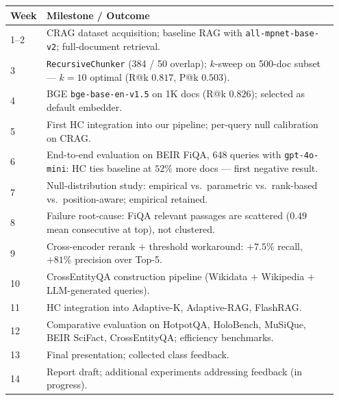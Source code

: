 \documentclass[letterpaper]{article}
\begin{document}
\begin{center}
\small
\begin{tabular}{p{0.07\linewidth}p{0.88\linewidth}}
\hline
Week & Milestone / Outcome \\
\hline
1--2  & CRAG \cite{crag2024} dataset acquisition; baseline RAG with
\texttt{all-mpnet-base-v2}; full-document retrieval. \\
3     & \texttt{RecursiveChunker} (384 / 50 overlap); $k$-sweep on
500-doc subset --- $k{=}10$ optimal (R@k $0.817$, P@k $0.503$). \\
4     & BGE \texttt{bge-base-en-v1.5} on 1K docs (R@k $0.826$);
selected as default embedder. \\
5     & First HC integration into our pipeline; per-query null
calibration on CRAG. \\
6     & End-to-end evaluation on BEIR FiQA, 648 queries with
\texttt{gpt-4o-mini}: HC ties baseline at $52\%$ more docs ---
first negative result. \\
7     & Null-distribution study: empirical vs.\ parametric vs.\
rank-based vs.\ position-aware; empirical retained. \\
8     & Failure root-cause: FiQA relevant passages are scattered
($0.49$ mean consecutive at top), not clustered. \\
9     & Cross-encoder rerank $+$ threshold workaround:
$+7.5\%$ recall, $+81\%$ precision over Top-5. \\
10    & CrossEntityQA construction pipeline (Wikidata $+$
Wikipedia $+$ LLM-generated queries). \\
11    & HC integration into Adaptive-K, Adaptive-RAG, FlashRAG. \\
12    & Comparative evaluation on HotpotQA, HoloBench, MuSiQue,
BEIR SciFact, CrossEntityQA; efficiency benchmarks. \\
13    & Final presentation; collected class feedback. \\
14    & Report draft; additional experiments addressing feedback
(in progress). \\
\hline
\end{tabular}
\end{center}
\end{document}
